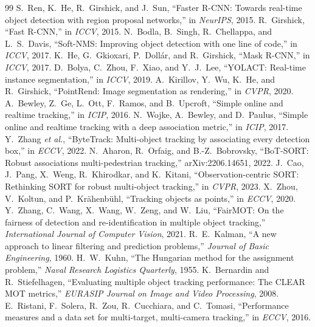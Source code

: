 \documentclass[11pt,a4paper]{article}
\begin{document}
\begin{thebibliography}{99}
 S.~Ren, K.~He, R.~Girshick, and J.~Sun, ``Faster R-CNN: Towards real-time object detection with region proposal networks,'' in \emph{NeurIPS}, 2015.
 R.~Girshick, ``Fast R-CNN,'' in \emph{ICCV}, 2015.
 N.~Bodla, B.~Singh, R.~Chellappa, and L.~S.~Davis, ``Soft-NMS: Improving object detection with one line of code,'' in \emph{ICCV}, 2017.
 K.~He, G.~Gkioxari, P.~Dollár, and R.~Girshick, ``Mask R-CNN,'' in \emph{ICCV}, 2017.
 D.~Bolya, C.~Zhou, F.~Xiao, and Y.~J.~Lee, ``YOLACT: Real-time instance segmentation,'' in \emph{ICCV}, 2019.
 A.~Kirillov, Y.~Wu, K.~He, and R.~Girshick, ``PointRend: Image segmentation as rendering,'' in \emph{CVPR}, 2020.
 A.~Bewley, Z.~Ge, L.~Ott, F.~Ramos, and B.~Upcroft, ``Simple online and realtime tracking,'' in \emph{ICIP}, 2016.
 N.~Wojke, A.~Bewley, and D.~Paulus, ``Simple online and realtime tracking with a deep association metric,'' in \emph{ICIP}, 2017.
 Y.~Zhang \emph{et al.}, ``ByteTrack: Multi-object tracking by associating every detection box,'' in \emph{ECCV}, 2022.
 N.~Aharon, R.~Orfaig, and B.-Z.~Bobrovsky, ``BoT-SORT: Robust associations multi-pedestrian tracking,'' arXiv:2206.14651, 2022.
 J.~Cao, J.~Pang, X.~Weng, R.~Khirodkar, and K.~Kitani, ``Observation-centric SORT: Rethinking SORT for robust multi-object tracking,'' in \emph{CVPR}, 2023.
 X.~Zhou, V.~Koltun, and P.~Krähenbühl, ``Tracking objects as points,'' in \emph{ECCV}, 2020.
 Y.~Zhang, C.~Wang, X.~Wang, W.~Zeng, and W.~Liu, ``FairMOT: On the fairness of detection and re-identification in multiple object tracking,'' \emph{International Journal of Computer Vision}, 2021.
 R.~E.~Kalman, ``A new approach to linear filtering and prediction problems,'' \emph{Journal of Basic Engineering}, 1960.
 H.~W.~Kuhn, ``The Hungarian method for the assignment problem,'' \emph{Naval Research Logistics Quarterly}, 1955.
 K.~Bernardin and R.~Stiefelhagen, ``Evaluating multiple object tracking performance: The CLEAR MOT metrics,'' \emph{EURASIP Journal on Image and Video Processing}, 2008.
 E.~Ristani, F.~Solera, R.~Zou, R.~Cucchiara, and C.~Tomasi, ``Performance measures and a data set for multi-target, multi-camera tracking,'' in \emph{ECCV}, 2016.

\end{thebibliography}
\end{document}
